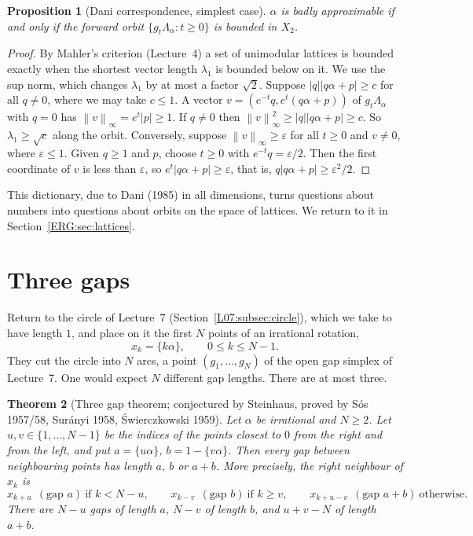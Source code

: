 \documentclass[11pt,openany]{book}
\theoremstyle{plain}
\newtheorem{theorem}{Theorem}[chapter]
\newtheorem{proposition}[theorem]{Proposition}
\theoremstyle{definition}
\theoremstyle{remark}
\newcommand{\Lat}{\Lambda}             %
\newcommand{\abs}[1]{\left\lvert #1 \right\rvert}
\newcommand{\norm}[1]{\left\lVert #1 \right\rVert}
\begin{document}
\begin{proposition}[Dani correspondence, simplest case]\label{ERG:prop:dani}
$\alpha$ is badly approximable if and only if the forward orbit $\{g_t\Lat_\alpha:t\ge0\}$ is bounded
in $X_2$.
\end{proposition}

\begin{proof}
By Mahler's criterion (Lecture~4) a set of unimodular lattices is bounded exactly when the shortest
vector length $\lambda_1$ is bounded below on it. We use the sup norm, which changes $\lambda_1$ by at
most a factor $\sqrt2$. Suppose $\abs q\abs{q\alpha+p}\ge c$ for all $q\neq0$, where we may take $c\le1$.
A vector $v=(e^{-t}q,e^t(q\alpha+p))$ of $g_t\Lat_\alpha$ with $q=0$ has $\norm v_\infty=e^t\abs p\ge1$.
If $q\neq0$ then $\norm v_\infty^2\ge\abs q\abs{q\alpha+p}\ge c$. So $\lambda_1\ge\sqrt c$ along the
orbit. Conversely, suppose $\norm v_\infty\ge\varepsilon$ for all $t\ge0$ and $v\neq0$, where
$\varepsilon\le1$. Given $q\ge1$ and $p$, choose $t\ge0$ with $e^{-t}q=\varepsilon/2$. Then the first
coordinate of $v$ is less than $\varepsilon$, so $e^t\abs{q\alpha+p}\ge\varepsilon$, that is,
$q\abs{q\alpha+p}\ge\varepsilon^2/2$.
\end{proof}

This dictionary, due to Dani (1985) in all dimensions, turns questions about numbers into questions about
orbits on the space of lattices. We return to it in Section~\ref{ERG:sec:lattices}.

\section{Three gaps}
\label{ERG:sec:threegap}

Return to the circle of Lecture~7 (Section~\ref{L07:subsec:circle}), which we take to have length $1$, and
place on it the first $N$ points of an irrational rotation,
\[
  x_k=\{k\alpha\},\qquad 0\le k\le N-1 .
\]
They cut the circle into $N$ arcs, a point $(g_1,\dots,g_N)$ of the open gap simplex of Lecture~7. One
would expect $N$ different gap lengths. There are at most three.

\begin{theorem}[Three gap theorem; conjectured by Steinhaus, proved by S\'os 1957/58, Sur\'anyi 1958, \'Swierczkowski 1959]\label{ERG:thm:threegap}
Let $\alpha$ be irrational and $N\ge2$. Let $u,v\in\{1,\dots,N-1\}$ be the indices of the points
closest to $0$ from the right and from the left, and put $a=\{u\alpha\}$, $b=1-\{v\alpha\}$. Then every
gap between neighbouring points has length $a$, $b$ or $a+b$. More precisely, the right neighbour of
$x_k$ is
\[
  x_{k+u}\ \ (\text{gap } a)\ \text{if } k<N-u,\qquad
  x_{k-v}\ \ (\text{gap } b)\ \text{if } k\ge v,\qquad
  x_{k+u-v}\ \ (\text{gap } a+b)\ \text{otherwise}.
\]
There are $N-u$ gaps of length $a$, $N-v$ of length $b$, and $u+v-N$ of length $a+b$.
\end{theorem}
\end{document}

